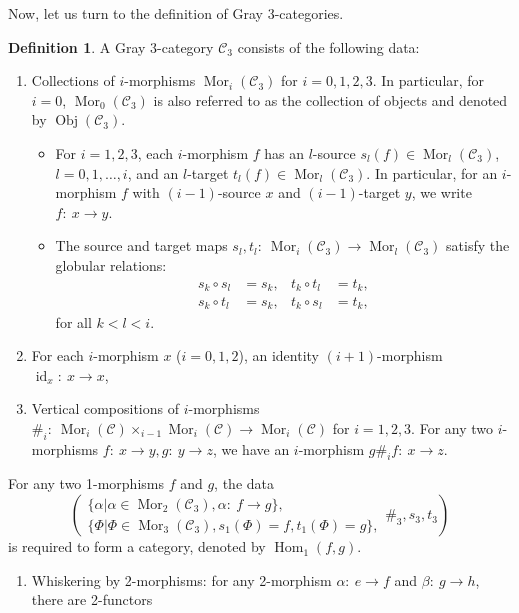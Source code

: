 \documentclass[11pt, reqno]{amsart} %
\newcommand{\obj}{{\mathop{\mathrm{Obj}}}}
\newcommand{\mor}{{\mathop{\mathrm{Mor}}}}
\newcommand{\Hom}{{\mathop{\mathrm{Hom}}}}
\newcommand{\id}{{\mathop{\mathrm{id}}}}
\newcommand{\cA}{{\mathcal{A}}}
\newcommand{\cC}{{\mathcal{C}}}
\theoremstyle{definition}
\newtheorem{definition}[theorem]{Definition}
\theoremstyle{remark}
\numberwithin{equation}{section}
\begin{document}
Now, let us turn to the definition of Gray 3-categories. 
\begin{definition}\label{def:Gray3}
A Gray 3-category $\cC_3$ consists of the following data:
\begin{enumerate}
  \item Collections of $i$-morphisms $\mor_i(\cC_3)$ for $i=0,1,2,3$. In particular, for $i=0$, $\mor_0(\cC_3)$ is also referred to as the collection of objects and denoted by $\obj(\cC_3)$.
  \begin{itemize}
    \item For $i=1,2,3$, each $i$-morphism $f$ has an $l$-source $s_l(f)\in \mor_l(\cC_3)$, $l=0,1,\ldots,i$, and an $l$-target $t_l(f)\in \mor_l(\cC_3)$. In particular, for an $i$-morphism $f$ with $(i-1)$-source $x$ and $(i-1)$-target $y$, we write $f:~x\to y$.
    \item The source and target maps $s_l,t_l:~\mor_i(\cC_3)\to\mor_l(\cC_3)$ satisfy the globular relations:
    \begin{align}
      \nonumber
      s_k\circ s_l &= s_k, & t_k\circ t_l &= t_k, \\
      \nonumber
      s_k\circ t_l &= s_k, & t_k\circ s_l &= t_k,
    \end{align}
    for all $k<l<i$. 
  \end{itemize}
  \item For each $i$-morphism $x$ ($i=0,1,2$), an identity $(i+1)$-morphism $\id_x:~x\to x$,
  \item Vertical compositions of $i$-morphisms $\#_i:~\mor_i(\cC)\times_{i-1} \mor_i(\cC) \to \mor_i(\cC)$ for $i=1,2,3$. For any two $i$-morphisms $f:~x\to y,g:~y\to z$, we have an $i$-morphism $g\#_if:~x\to z$. 
\end{enumerate}
For any two 1-morphisms $f$ and $g$, the data
\[
  \left(
    \begin{array}{l}
      \{\alpha|\alpha\in\mor_2(\cC_3),\alpha:~f\to g\}, \\
      \{\Phi|\Phi\in\mor_3(\cC_3),s_1(\Phi) = f,t_1(\Phi) = g\},
    \end{array}
    \#_3,s_3,t_3\right)
\]
is required to form a category, denoted by $\Hom_1(f,g)$.%
\begin{enumerate}
  \setcounter{enumi}{\thetemp}
  \item Whiskering by 2-morphisms: for any 2-morphism $\alpha:~e\to f$ and $\beta:~g\to h$, there are 2-functors 
  \begin{align}
    \nonumber

\end{align}
\end{enumerate}
\end{definition}
\end{document}

